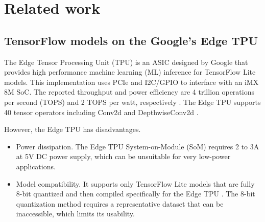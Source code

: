 \section{Related work}
\label{sec:related_work}
\subsection{TensorFlow models on the Google's Edge TPU}

The Edge Tensor Processing Unit (TPU) is an ASIC designed by Google that provides high performance machine learning (ML) inference for TensorFlow Lite models\cite{yazdanbakhsh2021evaluation}. This implementation uses PCIe and I2C/GPIO to interface with an iMX 8M SoC. The reported throughput and power efficiency are 4 trillion operations per second (TOPS) and 2 TOPS per watt, respectively \cite{coral2021Datasheet}. The Edge TPU supports 40 tensor operators including Conv2d and DepthwiseConv2d \cite{coral2021Compatibility}.

However, the Edge TPU has disadvantages.
\begin{itemize}
	\item Power dissipation. The Edge TPU System-on-Module (SoM) requires 2 to 3A at 5V DC power supply\cite{coral2021Datasheet}, which can be unsuitable for very low-power applications.
	\item Model compatibility. It supports only TensorFlow Lite models that are fully 8-bit quantized and then compiled specifically for the Edge TPU \cite{cass2019taking}. The 8-bit quantization method requires a representative dataset that can be inaccessible, which limits its usability.
\end{itemize}